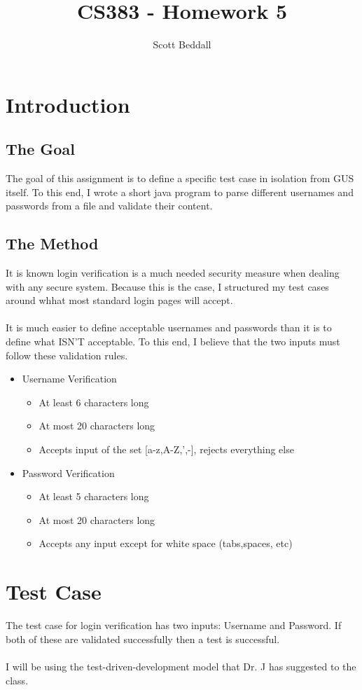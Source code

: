 \documentclass[12pt]{article}
\begin{document}
\title{CS383 - Homework 5}
\author{Scott Beddall}
\maketitle

\section{Introduction}
\subsection{The Goal}
The goal of this assignment is to define a specific test case in isolation from GUS itself. To this end, I wrote a short java program to parse different usernames and passwords from a file and validate their content.
\subsection{The Method}
It is known login verification is a much needed security measure when dealing with any secure system. Because this is the case, I structured my test cases around whhat most standard login pages will accept. \\\\
It is much easier to define acceptable usernames and passwords than it is to define what ISN'T acceptable. To this end, I believe that the two inputs must follow these validation rules.

\begin{itemize}
\item Username Verification
  \begin{itemize}
    \item At least 6 characters long
    \item At most 20 characters long
    \item Accepts input of the set [a-z,A-Z,',-], rejects everything else
  \end{itemize}
\item Password Verification
  \begin{itemize}
    \item At least 5 characters long
    \item At most 20 characters long
    \item Accepts any input except for white space (tabs,spaces, etc)
  \end{itemize}
\end{itemize}

\section{Test Case}
The test case for login verification has two inputs: Username and Password. If both of these are validated successfully then a test is successful.\\\\
I will be using the test-driven-development model that Dr. J has suggested to the class.
\end{document}
